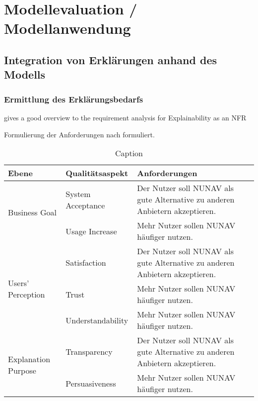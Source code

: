 \chapter{Modellevaluation / Modellanwendung}

\section{Integration von Erklärungen anhand des Modells}

\subsection{Ermittlung des Erklärungsbedarfs}

\cite{golledge1999wayfinding}

\cite{bovy2012route}

\cite{kohl_explainability_2019} gives a good overview to the requirement analysis for Explainability as an NFR

Formulierung der Anforderungen nach \cite{rajnish2010quality, wiegers1999writing, alexander2002writing} formuliert.

\begin{table}[]
    \centering
    \begin{tabular}{|p{}|p{}|p{}|}
        \hline
        \textbf{Ebene} & \textbf{Qualitätsaspekt} & \textbf{Anforderungen} \\
        \hline
        \multirow{2}{*}{Business Goal}      & System Acceptance & Der Nutzer soll NUNAV als gute Alternative zu anderen Anbietern akzeptieren.\\
        \cline{2-3}
                                            & Usage Increase & Mehr Nutzer sollen NUNAV häufiger nutzen.\\
        \hline
        \multirow{3}{*}{Users' Perception} & Satisfaction & Der Nutzer soll NUNAV als gute Alternative zu anderen Anbietern akzeptieren.\\
                                            \cline{2-3}
                                            & Trust & Mehr Nutzer sollen NUNAV häufiger nutzen.\\
                                            \cline{2-3}
                                            & Understandability & Mehr Nutzer sollen NUNAV häufiger nutzen.\\
        \hline
        \multirow{2}{*}{Explanation Purpose} & Transparency & Der Nutzer soll NUNAV als gute Alternative zu anderen Anbietern akzeptieren.\\
        \cline{2-3}
                                            & Persuasiveness & Mehr Nutzer sollen NUNAV häufiger nutzen.\\
        \hline
    \end{tabular}
    \caption{Caption}
    \label{tab:my_label}
\end{table}

